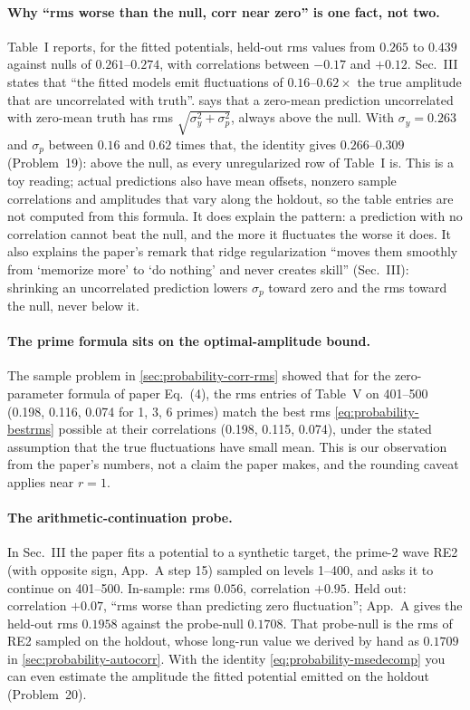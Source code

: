 \paragraph{Why ``rms worse than the null, corr near zero'' is one fact, not two.} Table~I reports, for the fitted potentials, held-out rms values from $0.265$ to $0.439$ against nulls of $0.261$--$0.274$, with correlations between $-0.17$ and $+0.12$. Sec.~III states that ``the fitted models emit fluctuations of $0.16$--$0.62\times$ the true amplitude that are uncorrelated with truth''.  says that a zero-mean prediction uncorrelated with zero-mean truth has rms $\sqrt{\sigma_y^2+\sigma_p^2}$, always above the null. With $\sigma_y=0.263$ and $\sigma_p$ between $0.16$ and $0.62$ times that, the identity gives $0.266$--$0.309$ (Problem~19): above the null, as every unregularized row of Table~I is. This is a toy reading; actual predictions also have mean offsets, nonzero sample correlations and amplitudes that vary along the holdout, so the table entries are not computed from this formula. It does explain the pattern: a prediction with no correlation cannot beat the null, and the more it fluctuates the worse it does. It also explains the paper's remark that ridge regularization ``moves them smoothly from `memorize more' to `do nothing' and never creates skill'' (Sec.~III): shrinking an uncorrelated prediction lowers $\sigma_p$ toward zero and the rms toward the null, never below it.

\paragraph{The prime formula sits on the optimal-amplitude bound.} The sample problem in \cref{sec:probability-corr-rms} showed that for the zero-parameter formula of paper Eq.~(4), the rms entries of Table~V on 401--500 (0.198, 0.116, 0.074 for 1, 3, 6 primes) match the best rms \cref{eq:probability-bestrms} possible at their correlations (0.198, 0.115, 0.074), under the stated assumption that the true fluctuations have small mean. This is our observation from the paper's numbers, not a claim the paper makes, and the rounding caveat applies near $r=1$.

\paragraph{The arithmetic-continuation probe.} In Sec.~III the paper fits a potential to a synthetic target, the prime-2 wave RE2 (with opposite sign, App.~A step 15) sampled on levels 1--400, and asks it to continue on 401--500. In-sample: rms $0.056$, correlation $+0.95$. Held out: correlation $+0.07$, ``rms worse than predicting zero fluctuation''; App.~A gives the held-out rms $0.1958$ against the probe-null $0.1708$. That probe-null is the rms of RE2 sampled on the holdout, whose long-run value we derived by hand as $0.1709$ in \cref{sec:probability-autocorr}. With the identity \cref{eq:probability-msedecomp} you can even estimate the amplitude the fitted potential emitted on the holdout (Problem~20).

